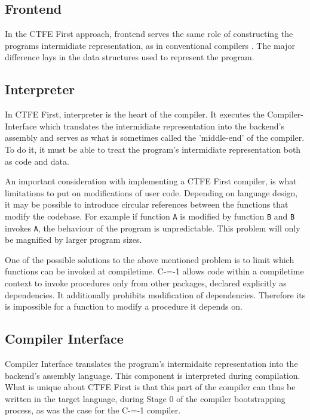 \subsection{Frontend}
\label{frontend}

In the CTFE First approach, frontend serves the same role of constructing the programs intermidiate representation, as in conventional compilers \cite{puntambekar:compiler_design}.
The major difference lays in the data structures used to represent the program.

\subsection{Interpreter}
\label{interpreter}

In CTFE First, interpreter is the heart of the compiler.
It executes the Compiler-Interface which translates the intermidiate representation into the backend's assembly and serves as what is sometimes called the 'middle-end' of the compiler\cite{hsu2021llvm}.
To do it, it must be able to treat the program's intermidiate representation both as code and data.

An important consideration with implementing a CTFE First compiler, is what limitations to put on modifications of user code.
Depending on language design, it may be possible to introduce circular references between the functions that modify the codebase.
For example if function \lstinline{A} is modified by function \lstinline{B} and \lstinline{B} invokes \lstinline{A}, the behaviour of the program is unpredictable.
This problem will only be magnified by larger program sizes.

One of the possible solutions to the above mentioned problem is to limit which functions can be invoked at compiletime.
C-=-1 allows code within a compiletime context to invoke procedures only from other packages, declared explicitly as dependencies.
It additionally prohibits modification of dependencies.
Therefore its is impossible for a function to modify a procedure it depends on.%

\subsection{Compiler Interface}
\label{compiler-interface}

Compiler Interface translates the program's intermidaite representation into the backend's assembly language.
This component is interpreted during compilation.
What is unique about CTFE First is that this part of the compiler can thus be written in the target language, during Stage 0 of the compiler bootstrapping process, as was the case for the C-=-1 compiler\cite{puntambekar:compiler_design, novillo2007gcc, grabski2022compilation}.

